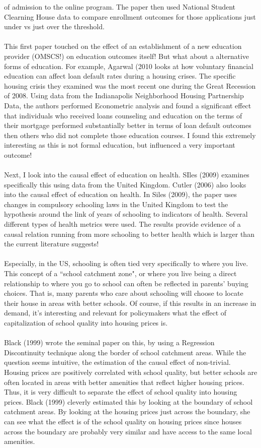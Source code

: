 \documentclass[12pt, final]{article}
\begin{document}
of admission to the online program. The paper then used National Student Clearning House data to compare enrollment outcomes for those applications just under vs just over the threshold. 
\\
\\
This first paper touched on the effect of an establishment of a new education provider (OMSCS!) on education outcomes itself! But what about a alternative forms of education. For example, Agarwal (2010 \cite{Agarwal} looks at how voluntary financial education can affect loan default rates during a housing crises. The specific housing crisis they examined was the most recent one during the Great Recession of 2008. Using data from the Indianapolis Neighborhood Housing Partnership Data, the authors performed Econometric analysis and found a significant effect that individuals who received loans counseling and education on the terms of their mortgage performed substantially better in terms of loan default outcomes then others who did not complete those education courses. I found this extremely interesting as this is not formal education, but influenced a very important outcome!
\\
\\
Next, I look into the causal effect of education on health. SIles (2009) \cite{Siles} examines specifically this using data from the United Kingdom. Cutler (2006) \cite{Cutler} also looks into the causal effect of education on health. In Siles (2009), the paper uses changes in compulsory schooling laws in the United Kingdom to test the hypothesis around the link of years of schooling to indicators of health. Several different types of health metrics were used. The results provide evidence of a causal relation running from more schooling to better health which is larger than the current literature suggests!
\\
\\
Especially, in the US, schooling is often tied very specifically to where you live. This concept of a ``school catchment zone", or where you live being a direct relationship to where you go to school can often be reflected in parents' buying choices. That is, many parents who care about schooling will choose to locate their house in areas with better schools. Of course, if this results in an increase in demand, it's interesting and relevant for policymakers what the effect of capitalization of school quality into housing prices is.
\\
\\
Black (1999) \cite{Black} wrote the seminal paper on this, by using a Regression Discontinuity technique along the border of school catchment areas. While the question seems intuitive, the estimation of the causal effect of non-trivial. Housing prices are positively correlated with school quality, but better schools are often located in areas with better amenities that reflect higher housing prices. Thus, it is very difficult to separate the effect of school quality into housing prices. Black (1999) cleverly estimated this by looking at the boundary of school catchment areas. By looking at the housing prices just across the boundary, she can see what the effect is of the school quality on housing prices since houses across the boundary are probably very similar and have access to the same local amenities.
\end{document}
